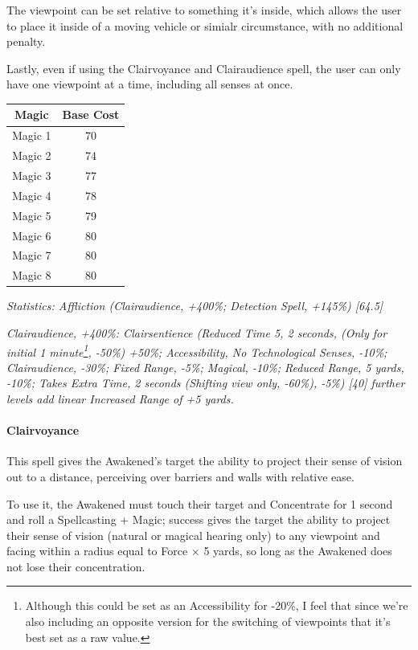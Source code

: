\begin{multicols}{3}
	The viewpoint can be set relative to something it's inside, which allows the user to place it inside of a moving vehicle or simialr circumstance, with no additional penalty.
	
	Lastly, even if using the Clairvoyance and Clairaudience spell, the user can only have one viewpoint at a time, including all senses at once.
	
	\begin{center}
		\begin{tabular}{|c|c|}
			\hline
			Magic & Base Cost \\
			\hline
			\hline
			Magic 1 & 70 \\
			Magic 2 & 74 \\
			Magic 3 & 77 \\
			Magic 4 & 78 \\
			Magic 5 & 79 \\
			Magic 6 & 80 \\
			Magic 7 & 80 \\
			Magic 8 & 80 \\
			\hline
		\end{tabular}
	\end{center}
	
	\textcolor{OliveGreen}{\textit{ Statistics: Affliction (Clairaudience, +400\%; Detection Spell, +145\%) [64.5]}}
	
	\textcolor{OliveGreen}{\textit{Clairaudience, +400\%: Clairsentience (Reduced Time 5, 2 seconds, (Only for initial 1 minute\footnote{Although this could be set as an Accessibility for -20\%, I feel that since we're also including an opposite version for the switching of viewpoints that it's best set as a raw value.}, -50\%) +50\%; Accessibility, No Technological Senses, -10\%; Clairaudience, -30\%; Fixed Range, -5\%; Magical, -10\%; Reduced Range, 5 yards, -10\%; Takes Extra Time, 2 seconds (Shifting view only, -60\%), -5\%) [40] further levels add linear Increased Range of +5 yards.}}
	
	\paragraph{Clairvoyance}
		
	This spell gives the Awakened's target the ability to project their sense of vision out to a distance, perceiving over barriers and walls with relative ease.
	
	To use it, the Awakened must touch their target and Concentrate for 1 second and roll a Spellcasting + Magic; success gives the target the ability to project their sense of vision (natural or magical hearing only) to any viewpoint and facing within a radius equal to Force $\times$ 5 yards, so long as the Awakened does not lose their concentration. 
	

\end{multicols}
